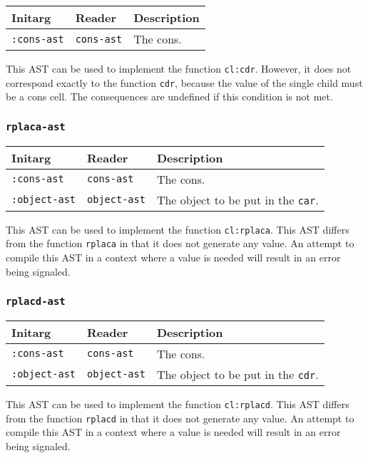 \begin{tabular}{|l|l|l|}
  \hline
  Initarg & Reader & Description\\
  \hline\hline
  \texttt{:cons-ast} & \texttt{cons-ast} & The cons.\\
  \hline
\end{tabular}

This AST can be used to implement the function \texttt{cl:cdr}. However,
it does not correspond exactly to the function \texttt{cdr}, because
the value of the single child must be a cons cell. The consequences
are undefined if this condition is not met.

\subsubsection{\texttt{rplaca-ast}}
\label{sec-ast-rplaca}

\begin{tabular}{|l|l|l|}
  \hline
  Initarg & Reader & Description\\
  \hline\hline
  \texttt{:cons-ast} & \texttt{cons-ast} & The cons.\\
  \hline
  \texttt{:object-ast} & \texttt{object-ast} & The object to be put in the \texttt{car}.\\
  \hline
\end{tabular}

This AST can be used to implement the function \texttt{cl:rplaca}.
This AST differs from the function \texttt{rplaca} in that it does
not generate any value. An attempt to compile this AST in a context
where a value is needed will result in an error being signaled.

\subsubsection{\texttt{rplacd-ast}}
\label{sec-ast-rplacd}

\begin{tabular}{|l|l|l|}
  \hline
  Initarg & Reader & Description\\
  \hline\hline
  \texttt{:cons-ast} & \texttt{cons-ast} & The cons.\\
  \hline
  \texttt{:object-ast} & \texttt{object-ast} & The object to be put in the \texttt{cdr}.\\
  \hline
\end{tabular}

This AST can be used to implement the function \texttt{cl:rplacd}.
This AST differs from the function \texttt{rplacd} in that it does
not generate any value. An attempt to compile this AST in a context
where a value is needed will result in an error being signaled.

